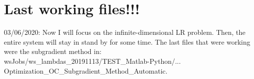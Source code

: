 \documentclass[12pt]{article}
\theoremstyle{definition}
\theoremstyle{remark}
\begin{document}
\section{{\color{red}Last working files!!!}}

03/06/2020: Now I will focus on the infinite-dimensional LR problem. Then, the entire system will stay in stand by for some time. The last files that were working were the subgradient method in:\\
wsJobs/ws\_lambdas\_20191113/TEST\_Matlab-Python/...\\
Optimization\_OC\_Subgradient\_Method\_Automatic.
\end{document}
